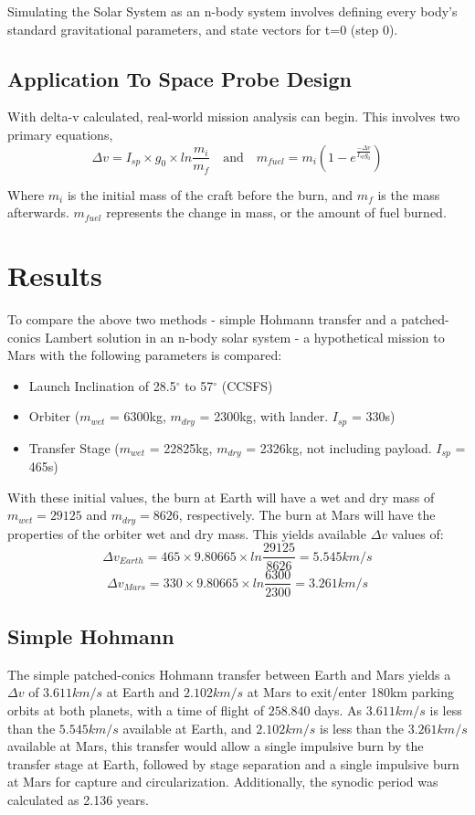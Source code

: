 \documentclass[conference]{IEEEtran}
\begin{document}
	Simulating the Solar System as an n-body system involves defining every body's standard gravitational parameters, and state vectors for t=0 (step 0). 
	
	\subsection{Application To Space Probe Design}
	
	With delta-v calculated, real-world mission analysis can begin. This involves two primary equations,
	\[
	\Delta v = I_{sp} \times g_0 \times ln\frac{m_i}{m_f}
	\quad\text{and}\quad
	m_{fuel} = m_i (1 - e^{\frac{-\Delta v}{I_{sp} g_0}})
	\]
	
	Where $m_i$ is the initial mass of the craft before the burn, and $m_f$ is the mass afterwards. $m_{fuel}$ represents the change in mass, or the amount of fuel burned.
	
	\section{Results}
	
	To compare the above two methods - simple Hohmann transfer and a patched-conics Lambert solution in an n-body solar system - a hypothetical mission to Mars with the following parameters is compared:
	\begin{itemize}
		\item Launch Inclination of 28.5$^\circ$ to 57$^\circ$ (CCSFS)
		\item Orbiter ($m_{wet}$ = 6300kg, $m_{dry}$ = 2300kg, with lander. $I_{sp}$ = 330s)
		\item Transfer Stage ($m_{wet}$ = 22825kg, $m_{dry}$ = 2326kg, not including payload. $I_{sp}$ = 465s)
	\end{itemize}
	
	With these initial values, the burn at Earth will have a wet and dry mass of $m_{wet} = 29125$ and $m_{dry} = 8626$, respectively. The burn at Mars will have the properties of the orbiter wet and dry mass. This yields available $\Delta v$ values of:
	\[
	\Delta v_{Earth} =465 \times 9.80665 \times ln\frac{29125}{8626} =  5.545 km/s
	\]
	\[
	\Delta v_{Mars} =330 \times 9.80665 \times ln\frac{6300}{2300} =  3.261 km/s
	\]
	
	\subsection{Simple Hohmann}
	The simple patched-conics Hohmann transfer between Earth and Mars yields a $\Delta v$ of $3.611km/s$ at Earth and $2.102km/s$ at Mars to exit/enter 180km parking orbits at both planets, with a time of flight of $258.840$ days. As $3.611km/s$ is less than the $5.545km/s$ available at Earth, and $2.102km/s$ is less than the $3.261km/s$ available at Mars, this transfer would allow a single impulsive burn by the transfer stage at Earth, followed by stage separation and a single impulsive burn at Mars for capture and circularization. Additionally, the synodic period was calculated as 2.136 years.
	
\end{document}
